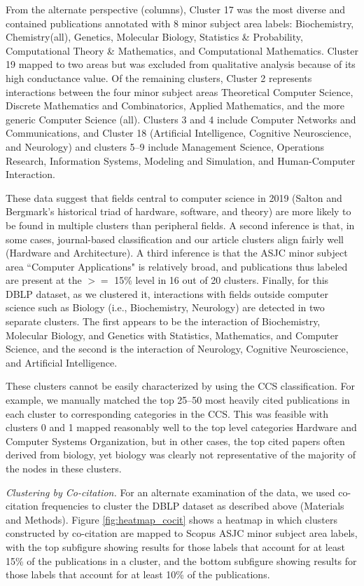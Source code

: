 From the alternate perspective (columns), Cluster 17 was the most diverse and contained publications annotated with 8 minor subject area labels: Biochemistry, Chemistry(all), Genetics, Molecular Biology,  Statistics \& Probability, Computational Theory \& Mathematics, and Computational Mathematics. Cluster 19 mapped to two areas but was excluded from qualitative analysis because of its high conductance value. 
Of the remaining clusters, Cluster 2 represents interactions between the four minor subject areas Theoretical Computer Science, Discrete Mathematics and Combinatorics, Applied Mathematics,  and the more generic Computer Science (all). Clusters 3 and 4 include Computer Networks and Communications, and Cluster 18 (Artificial Intelligence, Cognitive Neuroscience, and Neurology) and clusters 5--9 include Management Science, Operations Research, Information Systems, Modeling and Simulation, and Human-Computer Interaction.

These data suggest that fields central to computer science in 2019 (Salton and Bergmark's historical triad of hardware, software, and theory) are more likely to be found in multiple clusters than peripheral fields. A second inference is that, in some cases, journal-based classification and our article clusters align fairly well (Hardware and Architecture). 
A third inference is that the ASJC minor subject area ``Computer Applications" is relatively broad, and publications thus labeled are present at the $>=$ 15\% level in 16 out of 20 clusters.  Finally,   for this DBLP dataset, as we clustered it, interactions with fields outside computer science such as Biology  (i.e., Biochemistry, Neurology)  are  detected in two separate clusters. The first appears to be the interaction of Biochemistry, Molecular Biology, and Genetics with Statistics, Mathematics, and Computer Science, and the second is the interaction of Neurology, Cognitive Neuroscience, and Artificial Intelligence.

These clusters cannot be easily characterized by using the CCS classification. For example, we manually matched the top 25--50 most heavily cited publications in each cluster to corresponding categories in the CCS. This was feasible with clusters 0 and 1 mapped reasonably well to the top level categories Hardware and Computer Systems Organization, but in other cases, the top cited papers often derived from biology, yet biology was clearly not  representative of the majority of the nodes in these clusters. 

\emph{Clustering by Co-citation.} For an alternate examination of the data, we used co-citation frequencies to cluster the DBLP dataset as described above (Materials and Methods). Figure \ref{fig:heatmap_cocit} shows a heatmap in which clusters constructed by co-citation are mapped to Scopus ASJC minor subject area labels, with the top subfigure showing results for those labels that account for at least 15\% of the publications in a cluster, and the bottom subfigure showing results for those labels that account for at least 10\% of the publications. 


